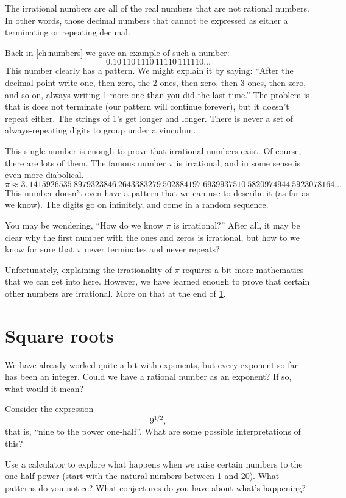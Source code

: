 The \glspl{irrational number} are all of the real numbers that are not rational numbers. In other words, those decimal numbers that cannot be expressed as either a terminating or repeating decimal.

Back in \cref{ch:numbers} we gave an example of such a number: \[0.10\,110\,1110\,11110\,111110\ldots\]
This number clearly has a pattern. We might explain it by saying: ``After the decimal point write one, then zero, the 2 ones, then zero, then 3 ones, then zero, and so on, always writing 1 more one than you did the last time.'' The problem is that is does not terminate (our pattern will continue forever), but it doesn't repeat either. The strings of 1's get longer and longer. There is never a set of always-repeating digits to group under a vinculum.

This single number is enough to prove that irrational numbers exist. Of course, there are lots of them. The famous number $\pi$ is irrational, and in some sense is even more diabolical.
\[\pi \approx 3. \, 1415926535 ~ 8979323846 ~ 2643383279 ~ 502884197 ~ 6939937510 ~ 5820974944 ~ 5923078164\ldots\]
This number doesn't even have a pattern that we can use to describe it (as far as we know). The digits go on infinitely, and come in a random sequence.

You may be wondering, ``How do we know $\pi$ is irrational?'' After all, it may be clear why the first number with the ones and zeros is irrational, but how to we know for sure that $\pi$ never terminates and never repeats?

Unfortunately, explaining the irrationality of $\pi$ requires a bit more mathematics that we can get into here. However, we have learned enough to prove that certain other numbers are irrational. More on that at the end of \cref{sec:radsquareroots}.

\section{Square roots}
\label{sec:radsquareroots}

We have already worked quite a bit with exponents, but every exponent so far has been an integer. Could we have a rational number as an exponent? If so, what would it mean?

\begin{boxedexplore}
Consider the expression \[9^{1/2},\] that is, ``nine to the power one-half''. What are some possible interpretations of this?

Use a calculator to explore what happens when we raise certain numbers to the one-half power (start with the natural numbers between 1 and 20). What patterns do you notice? What conjectures do you have about what's happening?
\end{boxedexplore}

